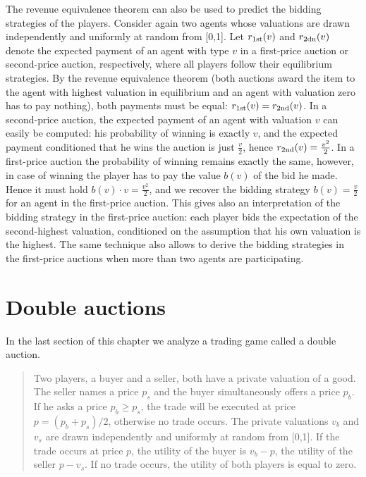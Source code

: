 The revenue equivalence theorem can also be used to predict the bidding strategies of the players. Consider again two agents whose valuations are drawn independently and uniformly at random from [0,1]. Let $r_{\rm 1st}(v)$ and $r_{\rm 2dn}(v)$ denote the expected payment of an agent with type $v$ in a first-price auction or second-price auction, respectively, where all players follow their equilibrium strategies. By the revenue equivalence theorem (both auctions award the item to the agent with highest valuation in equilibrium and an agent with valuation zero has to pay nothing), both payments must be equal: $r_{\rm 1st}(v) = r_{\rm 2nd}(v)$. In a second-price auction, the expected payment of an agent with valuation $v$ can easily be computed: his probability of winning is exactly $v$, and the expected payment conditioned that he wins the auction is just $\frac{v}{2}$, hence $r_{\rm 2nd}(v) = \frac{v^2}{2}$. In a first-price auction the probability of winning remains exactly the same, however, in case of winning the player has to pay the value $b(v)$ of the bid he made. Hence it must hold $b(v)\cdot v = \frac{v^2}{2}$, and we recover the bidding strategy $b(v)=\frac{v}{2}$ for an agent in the first-price auction. This gives also an interpretation of the bidding strategy in the first-price auction: each player bids the expectation of the second-highest valuation, conditioned on the assumption that his own valuation is the highest. The same technique also allows to derive the bidding strategies in the first-price auctions when more than two agents are participating.


\section{Double auctions}
\label{sec:auc:6}
In the last section of this chapter we analyze a trading game called a double auction.

\begin{quote}
Two players, a buyer and a seller, both have a private valuation of a good. The seller names a price $p_s$ and the buyer simultaneously offers a price $p_b$. If he asks a price $p_b \geq p_s$, the trade will be executed at price $p = (p_b + p_s)/2$, otherwise no trade occurs.
The private valuations $v_b$ and $v_s$ are drawn independently and uniformly at random from [0,1]. If the trade occurs at price $p$, the utility of the buyer is $v_b - p$, the utility of the seller $p-v_s$. If no trade occurs, the utility of both players is equal to zero.
\end{quote}

